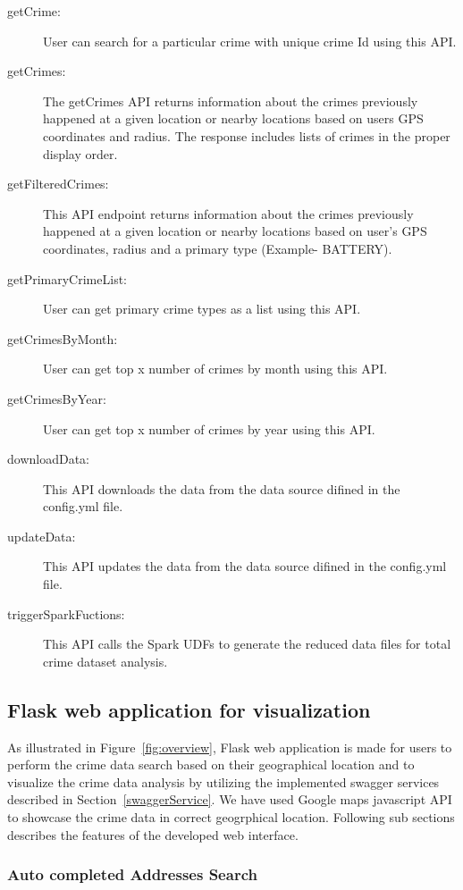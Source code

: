 \begin{description}
	
	\item[getCrime:] User can search for a particular crime with
	unique crime Id using this API.
        \item[getCrimes:] The
	getCrimes API returns information about the crimes previously
	happened at a given location or nearby locations based on
	users GPS coordinates and radius. The response includes lists
	of crimes in the proper display
	order.
        \item[getFilteredCrimes:] This API endpoint returns
	information about the crimes previously happened at a given
	location or nearby locations based on user’s GPS coordinates,
	radius and a primary type (Example-
	BATTERY).
        \item[getPrimaryCrimeList:] User can get primary
	crime types as a list using this
	API.
        \item[getCrimesByMonth:] User can get top x number of
	crimes by month using this API.
        \item[getCrimesByYear:] User
	can get top x number of crimes by year using this
	API.
        \item[downloadData:] This API downloads the data from
	the data source difined in the config.yml
	file.
        \item[updateData:] This API updates the data from the
	data source difined in the config.yml
	file.
        \item[triggerSparkFuctions:] This API calls the Spark
	UDFs to generate the reduced data files for total crime
	dataset analysis.
\end{description}

\subsection{Flask web application for visualization}\label{flaskWebApp}

As illustrated in Figure~\ref{fig:overview}, Flask web application is
made for users to perform the crime data search based on their
geographical location and to visualize the crime data analysis by
utilizing the implemented swagger services described in
Section~\ref{swaggerService}. We have used Google maps javascript API
to showcase the crime data in correct geogrphical location. Following
sub sections describes the features of the developed web interface.

\subsubsection{Auto completed Addresses Search}\label{addressSearch}

